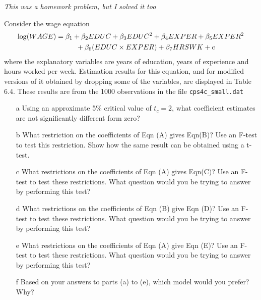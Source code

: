 \documentclass[xcolor={dvipsnames}]{beamer}
\begin{document}
	\begin{frame}[allowframebreaks]{6.4}
	\textit{This was a homework problem, but I solved it too}
	
	Consider the wage equation 
	\begin{align*}
	\log(WAGE) & = \beta_1 + \beta_2 EDUC + \beta_3 EDUC^2 + \beta_4 EXPER + \beta_5 EXPER^2\\
	& \hspace*{1cm} + \beta_6 (EDUC \times EXPER) + \beta_7 HRSWK + e
	\end{align*}
	 where the explanatory variables are years of education, years of experience and hours worked per week. Estimation results for this equation, and for modified versions of it obtained by dropping some of the variables, are displayed in Table 6.4. These results are from the 1000 observations in the file \texttt{cps4c\_small.dat}
	
	\begin{itemize}
		\item[a] Using an approximate 5\% critical value of $t_c = 2$, what coefficient estimates are not significantly different form zero?
		
		
		
		
		\item[b] What restriction on the coefficients of Eqn (A) gives Eqn(B)? Use an F-test to test this restriction. Show how the same result can be obtained using a t-test.
		
		\item[c] What restrictions on the coefficients of Eqn (A) gives Eqn(C)? Use an F-test to test these restrictions. What question would you be trying to answer by performing this test?
		
		\item[d] What restrictions on the coefficients of Eqn (B) give Eqn (D)? Use an F-test to test these restrictions. What question would you be trying to answer by performing this test?
		 
		\item[e] What restrictions on the coefficients of Eqn (A) give Eqn (E)? Use an F-test to test these restrictions. What question would you be trying to answer by performing this test?
		
		\item[f] Based on your answers to parts (a) to (e), which model would you prefer? Why?
		

\end{itemize}
\end{frame}
\end{document}
